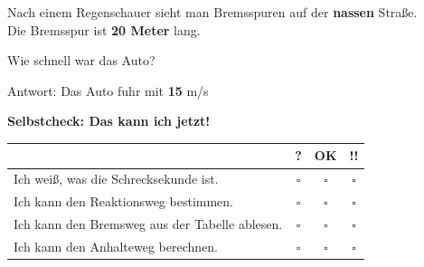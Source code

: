\documentclass[11pt,a4paper]{article}
\newcommand{\aufgabe}[1]{\textbf{\textcolor{physik}{#1}}}
\newcommand{\lsg}[1]{\textcolor{loesung}{\textbf{#1}}}
\begin{document}
\vspace{0.2em}
\begin{beispielbox}
Nach einem Regenschauer sieht man Bremsspuren auf der \textbf{nassen} Straße.\\
Die Bremsspur ist \textbf{20 Meter} lang.
\end{beispielbox}

\vspace{0.2em}
Wie schnell war das Auto?

\vspace{0.4em}
Antwort: Das Auto fuhr mit \lsg{15} m/s

\vspace{0.5em}

\aufgabe{Selbstcheck: Das kann ich jetzt!}

\vspace{0.3em}
\renewcommand{\arraystretch}{1.5}
\begin{tabular}{|p{10cm}|c|c|c|}
\hline
& \textbf{?} & \textbf{OK} & \textbf{!!} \\
\hline
Ich weiß, was die Schrecksekunde ist. & $\square$ & $\square$ & $\square$ \\
\hline
Ich kann den Reaktionsweg bestimmen. & $\square$ & $\square$ & $\square$ \\
\hline
Ich kann den Bremsweg aus der Tabelle ablesen. & $\square$ & $\square$ & $\square$ \\
\hline
Ich kann den Anhalteweg berechnen. & $\square$ & $\square$ & $\square$ \\
\hline
\end{tabular}
\end{document}
